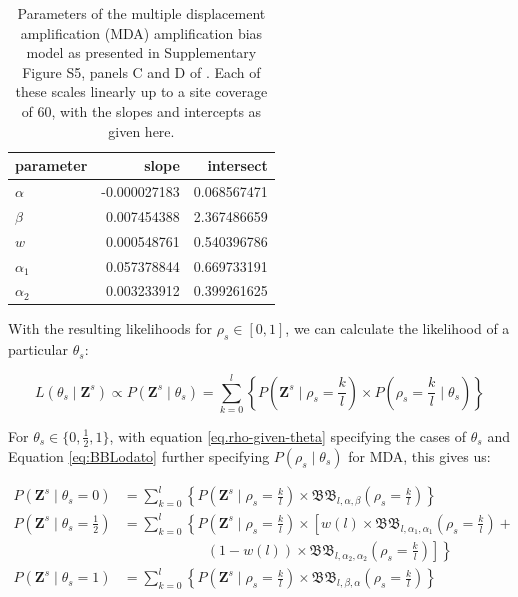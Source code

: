 \documentclass[authoryear,preprint,11pt]{scrartcl}
\newcommand{\Prob}{{P}}
\newcommand{\cB}{{\mathfrak B}}
\begin{document}
\begin{table}[tbp]
 \caption{
 Parameters of the multiple displacement amplification (MDA) amplification bias model as presented in Supplementary Figure S5, panels C and D of \cite{lodato_somatic_2015}.
 Each of these scales linearly up to a site coverage of 60, with the slopes and intercepts as given here.
 }
 \label{tab:Lodato-full}
 \renewcommand{\arraystretch}{1.15}

 \begin{center}
  \begin{tabular}{lrr}
   parameter  & slope        & intersect   \\
   \toprule
   $\alpha$   & -0.000027183 & 0.068567471 \\
   $\beta$    & 0.007454388  & 2.367486659 \\
   \midrule
   $w$        & 0.000548761  & 0.540396786 \\
   $\alpha_1$ & 0.057378844  & 0.669733191 \\
   $\alpha_2$ & 0.003233912  & 0.399261625 \\
   \bottomrule
  \end{tabular}
 \end{center}
\end{table}


With the resulting likelihoods for $\rho_s \in [0,1]$, we can calculate the likelihood of a particular $\theta_s$:

\begin{equation}
 \label{eq:theta-likelihood}
 L(\theta_s \mid\boldsymbol{Z}^s) \propto \Prob(\boldsymbol{Z}^s \mid \theta_s) = \sum_{k=0}^{l} \left\{ \Prob(\boldsymbol{Z}^s \mid \rho_s = \frac{k}{l}) \times \Prob(\rho_s = \frac{k}{l} \mid \theta_s) \right\}
\end{equation}

For $\theta_s \in \{0,\frac12,1\}$, with equation \ref{eq.rho-given-theta} specifying the cases of $\theta_s$ and Equation \ref{eq:BBLodato} further specifying $\Prob(\rho_s \mid \theta_s
 )$ for MDA, this gives us:

\begin{equation}
 \label{eq:thetas-likelihood}
 \begin{split}
  \Prob(\boldsymbol{Z}^s \mid \theta_s = 0) &=  \sum_{k=0}^{l} \left\{ \Prob(\boldsymbol{Z}^s \mid \rho_s = \frac{k}{l}) \times \cB\cB_{l,\alpha, \beta} (\rho_s = \frac{k}{l}) \right\}\\
  \Prob(\boldsymbol{Z}^s \mid \theta_s = \frac12) &= \sum_{k=0}^{l} \left\{ \Prob(\boldsymbol{Z}^s \mid \rho_s = \frac{k}{l}) \times \left[ w(l) \times \cB\cB_{l,\alpha_1,\alpha_1}(\rho_s = \frac{k}{l}) + \right.\right.\\
   &\qquad \qquad \qquad \left.\left.(1-w(l)) \times \cB\cB_{l,\alpha_2,\alpha_2}(\rho_s = \frac{k}{l}) \right] \right\} \\
  \Prob(\boldsymbol{Z}^s \mid \theta_s = 1) &=  \sum_{k=0}^{l} \left\{ \Prob(\boldsymbol{Z}^s \mid \rho_s = \frac{k}{l}) \times \cB\cB_{l,\beta, \alpha} (\rho_s = \frac{k}{l}) \right\}\\
 \end{split}
\end{equation}
\end{document}
